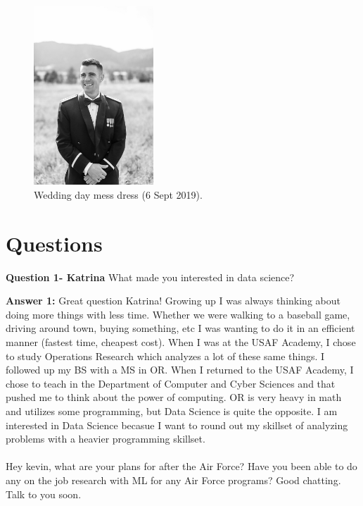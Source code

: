 \begin{figure}[!htb]
\centering
\includegraphics[width=0.4\textwidth]{Kevin.jpg}
\caption{\label{fig:me}Wedding day mess dress (6 Sept 2019).}
\end{figure}

\section{Questions}
\textbf{Question 1- Katrina} What made you interested in data science? 

\textbf{Answer 1:} Great question Katrina! Growing up I was always thinking about doing more things with less time. Whether we were walking to a baseball game, driving around town, buying something, etc I was wanting to do it in an efficient manner (fastest time, cheapest cost). When I was at the USAF Academy, I chose to study Operations Research which analyzes a lot of these same things. I followed up my BS with a MS in OR. When I returned to the USAF Academy, I chose to teach in the Department of Computer and Cyber Sciences and that pushed me to think about the power of computing. OR is very heavy in math and utilizes some programming, but Data Science is quite the opposite. I am interested in Data Science becasue I want to round out my skillset of analyzing problems with a heavier programming skillset.

\paragraph{}
Hey kevin, what are your plans for after the Air Force?  Have you been able to do any on the job research with ML for any Air Force programs?  Good chatting. Talk to you soon.


%
